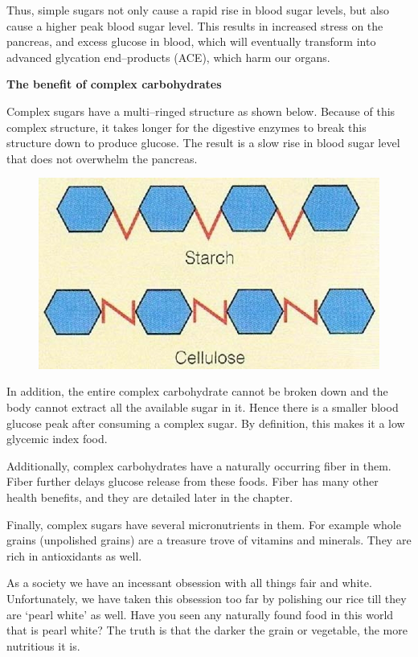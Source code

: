 Thus, simple sugars not only cause a rapid rise in blood sugar levels, but also cause a higher peak blood sugar level. This results in increased stress on the pancreas, and excess glucose in blood, which will eventually transform into advanced glycation end–products (ACE), which harm our organs.

\noindent\textbf{The benefit of complex carbohydrates}

Complex sugars have a multi–ringed structure as shown below. Because of this complex structure, it takes longer for the digestive enzymes to break this structure down to produce glucose. The result is a slow rise in blood sugar level that does not overwhelm the pancreas.

\begin{figure}
\centering
\includegraphics[scale=.8]{images/081.jpg}
\end{figure}

In addition, the entire complex carbohydrate cannot be broken down and the body cannot extract all the available sugar in it. Hence there is a smaller blood glucose peak after consuming a complex sugar. By definition, this makes it a low glycemic index food.

Additionally, complex carbohydrates have a naturally occurring fiber in them. Fiber further delays glucose release from these foods. Fiber has many other health benefits, and they are detailed later in the chapter.

Finally, complex sugars have several micronutrients in them. For example whole grains (unpolished grains) are a treasure trove of vitamins and minerals. They are rich in antioxidants as well.

As a society we have an incessant obsession with all things fair and white. Unfortunately, we have taken this obsession too far by polishing our rice till they are ‘pearl white’ as well. Have you seen any naturally found food in this world that is pearl white? The truth is that the darker the grain or vegetable, the more nutritious it is.

